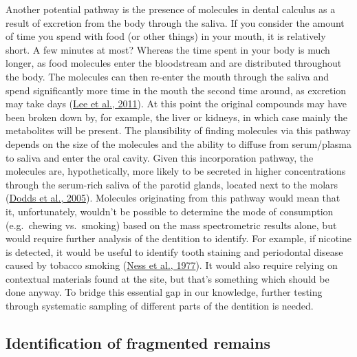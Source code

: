 \documentclass[
  letterpaper,
]{book}
\begin{document}
Another potential pathway is the presence of molecules in dental
calculus as a result of excretion from the body through the saliva. If
you consider the amount of time you spend with food (or other things) in
your mouth, it is relatively short. A few minutes at most? Whereas the
time spent in your body is much longer, as food molecules enter the
bloodstream and are distributed throughout the body. The molecules can
then re-enter the mouth through the saliva and spend significantly more
time in the mouth the second time around, as excretion may take days
(\protect\hyperlink{ref-leeOralFluid2011}{Lee et al., 2011}). At this
point the original compounds may have been broken down by, for example,
the liver or kidneys, in which case mainly the metabolites will be
present. The plausibility of finding molecules via this pathway depends
on the size of the molecules and the ability to diffuse from
serum/plasma to saliva and enter the oral cavity. Given this
incorporation pathway, the molecules are, hypothetically, more likely to
be secreted in higher concentrations through the serum-rich saliva of
the parotid glands, located next to the molars
(\protect\hyperlink{ref-doddsHealthBenefits2005}{Dodds et al., 2005}).
Molecules originating from this pathway would mean that it,
unfortunately, wouldn't be possible to determine the mode of consumption
(e.g.~chewing vs.~smoking) based on the mass spectrometric results
alone, but would require further analysis of the dentition to identify.
For example, if nicotine is detected, it would be useful to identify
tooth staining and periodontal disease caused by tobacco smoking
(\protect\hyperlink{ref-nessEpidemiologicStudy1977}{Ness et al., 1977}).
It would also require relying on contextual materials found at the site,
but that's something which should be done anyway. To bridge this
essential gap in our knowledge, further testing through systematic
sampling of different parts of the dentition is needed.

\hypertarget{identification-of-fragmented-remains}{%
\subsection{Identification of fragmented
remains}\label{identification-of-fragmented-remains}}
\end{document}
